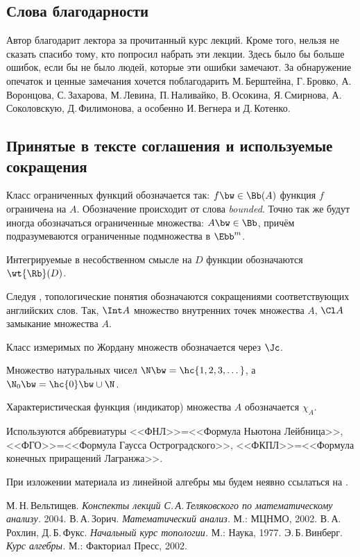 \documentclass[a4paper]{article}
\newcommand{\Rbt}{\wt{\Rb}}
\begin{document}
\subsection*{Слова благодарности}
Автор благодарит лектора за прочитанный курс лекций. Кроме того, нельзя не сказать
спасибо тому, кто попросил набрать эти лекции. Здесь было бы больше ошибок,
если бы не было людей, которые эти ошибки замечают. За обнаружение опечаток и ценные замечания
хочется поблагодарить М.\,Берштейна, Г.\,Бровко, А.\,Воронцова, С.\,Захарова, М.\,Левина,
П.\,Наливайко, В.\,Осокина, Я.\,Смирнова, А.\,Соколовскую, Д.\,Филимонова,
а особенно И.\,Вегнера и Д.\,Котенко.

\subsection*{Принятые в тексте соглашения и используемые сокращения}

\begin{points}{-3}
\item Класс ограниченных функций обозначается так: $f \bw\in \Bb(A)$ функция $f$ ограничена на
      $A$. Обозначение происходит от слова \emph{bounded}. Точно так же будут иногда обозначаться
      ограниченные множества: $A \bw\in \Bb$, причём подразумеваются ограниченные подмножества в $\Ebb^m$.
\item Интегрируемые в несобственном смысле на $D$ функции обозначаются $\Rbt(D)$.
\item Следуя \cite{rokhlin}, топологические понятия обозначаются сокращениями соответствующих английских слов.
      Так, $\Int A$ множество внутренних точек множества $A$, $\Cl A$ замыкание множества $A$.
\item Класс измеримых по Жордану множеств обозначается через $\Jc$.
\item Множество натуральных чисел $\N \bw= \hc{1,2,3,\dots}$, а $\N_0 \bw= \hc{0} \bw\cup \N$.
\item Характеристическая функция (индикатор) множества $A$ обозначается $\chi_A$.
\item Используются аббревиатуры <<ФНЛ>>=<<Формула Ньютона Лейбница>>,
      <<ФГО>>=<<Формула Гаусса Остроградского>>, <<ФКПЛ>>=<<Формула конечных приращений Лагранжа>>.
\item При изложении материала из линейной алгебры мы будем неявно ссылаться на \cite{vinberg}.
\end{points}

\begin{thebibliography}{4}
\setlength\itemsep{-.5mm}
М.\,Н.\,Вельтищев. \emph{Конспекты лекций С.\,А.\,Теляковского по математическому анализу.} 2004.
В.\,А.\,Зорич. \emph{Математический анализ.} М.: МЦНМО, 2002.
В.\,А.\,Рохлин, Д.\,Б.\,Фукс. \emph{Начальный курс топологии.} М.: Наука, 1977.
Э.\,Б.\,Винберг. \emph{Курс алгебры.} М.: Факториал Пресс, 2002.
\end{thebibliography}
\end{document}
